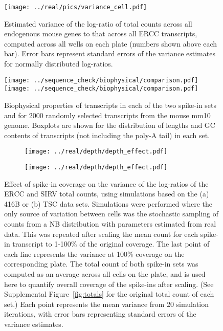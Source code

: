 \documentclass{article}
\begin{document}
\begin{figure}[btp]
    \begin{center}
        \texttt{[image: ../real/pics/variance\_cell.pdf]}
    \end{center}
    \caption{Estimated variance of the log-ratio of total counts across all endogenous mouse genes to that across all ERCC transcripts, computed across all wells on each plate (numbers shown above each bar).
        Error bars represent standard errors of the variance estimates for normally distributed log-ratios.
    }
\end{figure}

\begin{figure}[btp]
    \begin{center}
        \texttt{[image: ../sequence\_check/biophysical/comparison.pdf]}
        \texttt{[image: ../sequence\_check/biophysical/comparison.pdf]}
    \end{center}
    \caption{Biophysical properties of transcripts in each of the two spike-in sets and for 2000 randomly selected transcripts from the mouse mm10 genome.
    Boxplots are shown for the distribution of lengths and GC contents of transcripts (not including the poly-A tail) in each set.
}
\end{figure}

\begin{figure}[btp]
    \begin{center}
        \begin{subfigure}{0.49\textwidth}
            \texttt{[image: ../real/depth/depth\_effect.pdf]}
            \caption{}
        \end{subfigure}
        \begin{subfigure}{0.49\textwidth}
            \texttt{[image: ../real/depth/depth\_effect.pdf]}
            \caption{}
        \end{subfigure}
    \end{center}
    \caption{Effect of spike-in coverage on the variance of the log-ratios of the ERCC and SIRV total counts, using simulations based on the (a) 416B or (b) TSC data sets.
        Simulations were performed where the only source of variation between cells was the stochastic sampling of counts from a NB distribution with parameters estimated from real data.
        This was repeated after scaling the mean count for each spike-in transcript to 1-100\% of the original coverage. 
        The last point of each line represents the variance at 100\% coverage on the corresponding plate.
        The total count of both spike-in sets was computed as an average across all cells on the plate, and is used here to quantify overall coverage of the spike-ins after scaling. 
        (See Supplemental Figure~\ref{fig:totals} for the original total count of each set.)
        Each point represents the mean variance from 20 simulation iterations, with error bars representing standard errors of the variance estimates.
    }
    \label{fig:sampledepth}
\end{figure}
\end{document}
